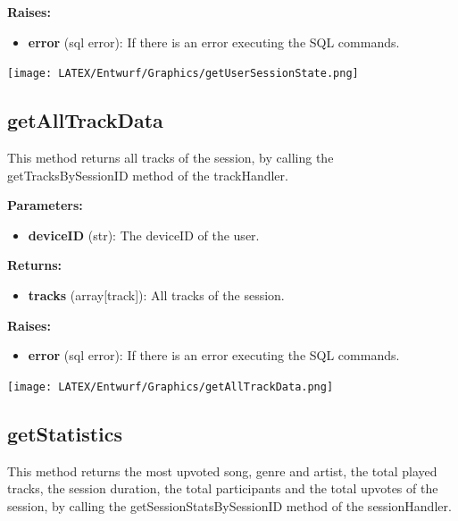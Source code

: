 \documentclass[oneside, ngerman]{sdqtechreport}
\begin{document}
\textbf{Raises:}

\begin{itemize}
    \item \textbf{error} (sql error): If there is an error executing the SQL commands.
\end{itemize}

\begin{center}
   \texttt{[image: LATEX/Entwurf/Graphics/getUserSessionState.png]} 
\end{center}




\subsection*{getAllTrackData}

This method returns all tracks of the session, by calling the getTracksBySessionID method of the trackHandler.

\textbf{Parameters:}

\begin{itemize}
    \item \textbf{deviceID} (str): The deviceID of the user.
\end{itemize}

\textbf{Returns:}

\begin{itemize}
    \item \textbf{tracks} (array[track]): All tracks of the session.
\end{itemize}

\textbf{Raises:}

\begin{itemize}
    \item \textbf{error} (sql error): If there is an error executing the SQL commands.
\end{itemize}

\begin{center}
   \texttt{[image: LATEX/Entwurf/Graphics/getAllTrackData.png]} 
\end{center}



\subsection*{getStatistics}

This method returns the most upvoted song, genre and artist, the total played tracks, the session duration, the total participants and the total upvotes of the session, by calling the getSessionStatsBySessionID method of the sessionHandler.
\end{document}
